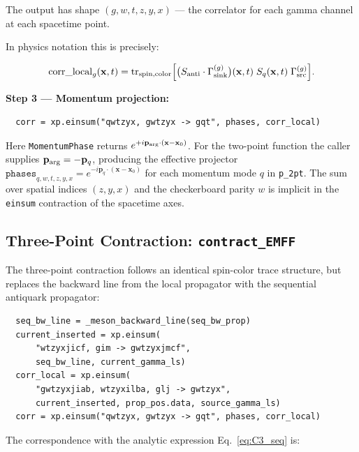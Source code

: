 \documentclass[11pt,a4paper]{article}
\newcommand{\gsrc}{\Gamma_{\text{src}}}
\newcommand{\gsink}{\Gamma_{\text{sink}}}
\newcommand{\Sq}{S_{q}}
\newcommand{\Santi}{S_{\text{anti}}}
\newcommand{\einsum}{\texttt{einsum}}
\begin{document}
The output has shape \((g, w, t, z, y, x)\) --- the correlator for each gamma
channel at each spacetime point.

In physics notation this is precisely:

\begin{equation}
\operatorname{corr\_local}_{g}(\mathbf{x}, t)
  = \tr_{\text{spin,color}}\!\Big[
      \big(\Santi \cdot \gsink^{(g)}\big)(\mathbf{x}, t) \;
      \Sq(\mathbf{x}, t) \;
      \gsrc^{(g)}
    \Big] .
\label{eq:corr_local}
\end{equation}

\textbf{Step 3 --- Momentum projection:}
\begin{verbatim}
  corr = xp.einsum("qwtzyx, gwtzyx -> gqt", phases, corr_local)
\end{verbatim}

Here \texttt{MomentumPhase} returns
\(e^{+i\mathbf{p}_{\rm arg}\cdot(\mathbf{x}-\mathbf{x}_0)}\).  For the
two-point function the caller supplies
\(\mathbf{p}_{\rm arg}=-\mathbf{p}_q\), producing the effective projector
\(\texttt{phases}_{q,w,t,z,y,x}
=e^{-i\mathbf{p}_q\cdot(\mathbf{x}-\mathbf{x}_0)}\) for each momentum mode
\(q\) in \texttt{p\_2pt}.  The sum over spatial indices
\((z, y, x)\) and the checkerboard parity \(w\) is implicit in the \einsum{}
contraction of the spacetime axes.

\subsection{Three-Point Contraction: \texttt{contract\_EMFF}}

The three-point contraction follows an identical spin-color trace structure, but
replaces the backward line from the local propagator with the sequential
antiquark propagator:

\begin{verbatim}
  seq_bw_line = _meson_backward_line(seq_bw_prop)
  current_inserted = xp.einsum(
      "wtzyxjicf, gim -> gwtzyxjmcf",
      seq_bw_line, current_gamma_ls)
  corr_local = xp.einsum(
      "gwtzyxjiab, wtzyxilba, glj -> gwtzyx",
      current_inserted, prop_pos.data, source_gamma_ls)
  corr = xp.einsum("qwtzyx, gwtzyx -> gqt", phases, corr_local)
\end{verbatim}

The correspondence with the analytic expression
Eq.~\eqref{eq:C3_seq} is:
\end{document}
